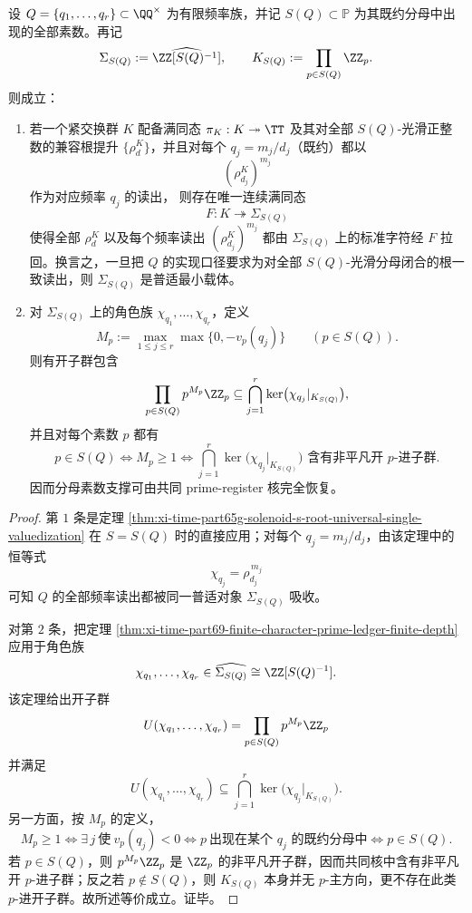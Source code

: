 \begin{theorem}\label{thm:xi-time-part65g-frequency-prime-support-kernel-recovery}
设 \(Q=\{q_1,\dots,q_r\}\subset\QQ^\times\) 为有限频率族，并记 \(S(Q)\subset\mathbb P\) 为其既约分母中出现的全部素数。再记
\[
\Sigma_{S(Q)}:=\widehat{\ZZ[S(Q)^{-1}]},
\qquad
K_{S(Q)}:=\prod_{p\in S(Q)}\ZZ_p.
\]
则成立：
\begin{enumerate}
  \item 若一个紧交换群 \(K\) 配备满同态 \(\pi_K:K\twoheadrightarrow \TT\) 及其对全部 \(S(Q)\)-光滑正整数的兼容根提升 \(\{\rho_d^K\}\)，并且对每个 \(q_j=m_j/d_j\)（既约）都以
  \[
  (\rho_{d_j}^K)^{m_j}
  \]
  作为对应频率 \(q_j\) 的读出，
  则存在唯一连续满同态
  \[
  F:K\twoheadrightarrow \Sigma_{S(Q)}
  \]
  使得全部 \(\rho_d^K\) 以及每个频率读出 \((\rho_{d_j}^K)^{m_j}\) 都由 \(\Sigma_{S(Q)}\) 上的标准字符经 \(F\) 拉回。换言之，一旦把 \(Q\) 的实现口径要求为对全部 \(S(Q)\)-光滑分母闭合的根一致读出，则 \(\Sigma_{S(Q)}\) 是普适最小载体。
  \item 对 \(\Sigma_{S(Q)}\) 上的角色族 \(\chi_{q_1},\dots,\chi_{q_r}\)，定义
  \[
  M_p:=\max_{1\le j\le r}\max\{0,-v_p(q_j)\}
  \qquad (p\in S(Q)).
  \]
  则有开子群包含
  \[
  \prod_{p\in S(Q)}p^{M_p}\ZZ_p
  \subseteq
  \bigcap_{j=1}^{r}\ker\bigl(\chi_{q_j}|_{K_{S(Q)}}\bigr),
  \]
  并且对每个素数 \(p\) 都有
  \[
  p\in S(Q)
  \iff
  M_p\ge 1
  \iff
  \bigcap_{j=1}^{r}\ker\bigl(\chi_{q_j}|_{K_{S(Q)}}\bigr)
  \text{ 含有非平凡开 }p\text{-进子群}.
  \]
  因而分母素数支撑可由共同 prime-register 核完全恢复。
\end{enumerate}
\end{theorem}
\begin{proof}
第 \(1\) 条是定理 \ref{thm:xi-time-part65g-solenoid-s-root-universal-single-valuedization} 在 \(S=S(Q)\) 时的直接应用；对每个 \(q_j=m_j/d_j\)，由该定理中的恒等式
\[
\chi_{q_j}=\rho_{d_j}^{\,m_j}
\]
可知 \(Q\) 的全部频率读出都被同一普适对象 \(\Sigma_{S(Q)}\) 吸收。

对第 \(2\) 条，把定理 \ref{thm:xi-time-part69-finite-character-prime-ledger-finite-depth} 应用于角色族
\[
\chi_{q_1},\dots,\chi_{q_r}\in \widehat{\Sigma_{S(Q)}}\cong \ZZ[S(Q)^{-1}].
\]
该定理给出开子群
\[
U(\chi_{q_1},\dots,\chi_{q_r})
=
\prod_{p\in S(Q)}p^{M_p}\ZZ_p
\]
并满足
\[
U(\chi_{q_1},\dots,\chi_{q_r})
\subseteq
\bigcap_{j=1}^{r}\ker\bigl(\chi_{q_j}|_{K_{S(Q)}}\bigr).
\]
另一方面，按 \(M_p\) 的定义，
\[
M_p\ge 1
\iff
\exists\,j\ \text{使}\ v_p(q_j)<0
\iff
p\ \text{出现在某个 }q_j\text{ 的既约分母中}
\iff
p\in S(Q).
\]
若 \(p\in S(Q)\)，则 \(p^{M_p}\ZZ_p\) 是 \(\ZZ_p\) 的非平凡开子群，因而共同核中含有非平凡开 \(p\)-进子群；反之若 \(p\notin S(Q)\)，则 \(K_{S(Q)}\) 本身并无 \(p\)-主方向，更不存在此类 \(p\)-进开子群。故所述等价成立。证毕。
\end{proof}

